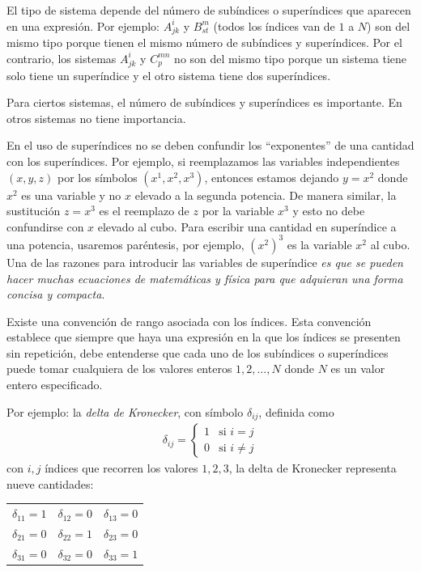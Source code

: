 \documentclass[hidelinks,12pt]{article}
\begin{document}
\par
El tipo de sistema depende del número de subíndices o superíndices que aparecen en una expresión. Por ejemplo: $A_{jk}^{i}$ y $B_{st}^{m}$ (todos los índices van de $1$ a $N$) son del mismo tipo porque tienen el mismo número de subíndices y superíndices. Por el contrario, los sistemas $A_{jk}^{i}$ y $C_{p}^{mn}$ no son del mismo tipo porque un sistema tiene solo tiene un superíndice y el otro sistema tiene dos superíndices.
\par
Para ciertos sistemas, el número de subíndices y superíndices es importante. En otros sistemas no tiene importancia.
\par
En el uso de superíndices no se deben confundir los \enquote{exponentes} de una cantidad con los superíndices. Por ejemplo, si reemplazamos las variables independientes $(x, y, z)$ por los símbolos $(x^{1}, x^{2}, x^{3})$, entonces estamos dejando $y = x^{2}$ donde $x^{2}$ es una variable y no $x$ elevado a la segunda potencia. De manera similar, la sustitución $z = x^{3}$ es el reemplazo de $z$ por la variable $x^{3}$ y esto no debe confundirse con $x$ elevado al cubo. Para escribir una cantidad en superíndice a una potencia, usaremos paréntesis, por ejemplo, $(x^{2})^{3}$ es la variable $x^{2}$ al cubo. Una de las razones para introducir las variables de superíndice \emph{es que se pueden hacer muchas ecuaciones de matemáticas y física para que adquieran una forma concisa y compacta}.
\par
Existe una convención de rango asociada con los índices. Esta convención establece que siempre que haya una expresión en la que los índices se presenten sin repetición, debe entenderse que cada uno de los subíndices o superíndices puede tomar cualquiera de los valores enteros $1, 2, \ldots, N$ donde $N$ es un valor entero especificado.
\par
Por ejemplo: la \emph{delta de Kronecker}, con símbolo $\delta_{ij}$, definida como
\begin{align*}
\delta_{ij} = \begin{cases}
1 & \mbox{si } i = j \\[0.5em]
0 & \mbox{si } i \neq j
\end{cases}
\end{align*}
con $i, j$ índices que recorren los valores $1, 2, 3$, la delta de Kronecker representa nueve cantidades:
\begin{table}[H]
\large
\centering
\begin{tabular}{c c c}
$\delta_{11} = 1$ & $\delta_{12} = 0$ & $\delta_{13} = 0$ \\
$\delta_{21} = 0$ & $\delta_{22} = 1$ & $\delta_{23} = 0$ \\
$\delta_{31} = 0$ & $\delta_{32} = 0$ & $\delta_{33} = 1$
\end{tabular}
\end{table}
\end{document}
